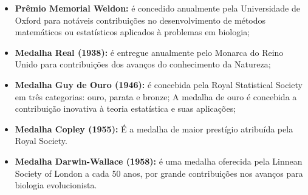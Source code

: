 \begin{itemize}
    \item \textbf{Prêmio Memorial Weldon:} é concedido anualmente pela Universidade de Oxford para notáveis contribuições no desenvolvimento de métodos matemáticos ou estatísticos aplicados à problemas em biologia; 
    \item \textbf{Medalha Real (1938):} é entregue anualmente pelo Monarca do Reino Unido para contribuições dos avanços do conhecimento da Natureza;
    \item \textbf{Medalha Guy de Ouro (1946):} é concebida pela Royal Statistical Society em três categorias: ouro, parata e bronze; A medalha de ouro é concebida a contribuição inovativa à teoria estatística e suas aplicações;
    \item \textbf{Medalha Copley (1955):} É a medalha de maior prestígio atribuída pela Royal Society.
    \item \textbf{Medalha Darwin-Wallace (1958):} é uma medalha oferecida pela Linnean Society of London a cada 50 anos, por grande contribuições nos avanços para biologia evolucionista.
\end{itemize}


